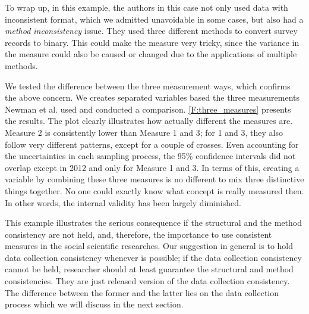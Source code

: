 To wrap up, in this example, the authors in this case not only used data with inconsistent format, which we admitted unavoidable in some cases, but also had a \textit{method inconsistency} issue. They used three different methods to convert survey records to binary. This could make the measure very tricky, since the variance in the measure could also be caused or changed due to the applications of multiple methods. 

We tested the difference between the three measurement ways, which confirms the above concern. We creates separated variables based the three measurements Newman et al. used and conducted a comparison. \cref{F:three_measures} presents the results. The plot clearly illustrates how actually different the measures are. Measure 2 is consistently lower than Measure 1 and 3; for 1 and 3, they also follow very different patterns, except for a couple of crosses. Even accounting for the uncertainties in each sampling process, the 95\% confidence intervals did not overlap except in 2012 and only for Measure 1 and 3. In terms of this, creating a variable by combining these three measures is no different to mix three distinctive things together. No one could exactly know what concept is really measured then. In other words, the internal validity has been largely diminished. 

This example illustrates the serious consequence if the structural and the method consistency are not held, and, therefore, the importance to use consistent measures in the social scientific researches. Our suggestion in general is to hold data collection consistency whenever is possible; if the data collection consistency cannot be held, researcher should at least guarantee the structural and method consistencies. They are just released version of the data collection consistency. The difference between the former and the latter lies on the data collection process which we will discuss in the next section.



